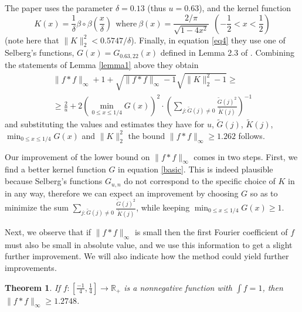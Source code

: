 \documentclass[12pt]{amsart}
\newtheorem{theorem}{Theorem}[section]
\theoremstyle{definition}
\newcommand{\R}{\ensuremath{\mathbb{R}}}
\begin{document}
\medskip

The paper \cite{martin} uses the parameter $\delta=0.13$ (thus
$u=0.63$), and the kernel function
\begin{equation}\label{kx}K(x)=\frac{1}{\delta}\beta \circ \beta
\left( \frac{x}{\delta} \right) \ \ \mathrm{where}
 \ \beta(x)=\frac{2/\pi}{\sqrt{1-4x^2}}  \ \ \left( -\frac{1}{2}<x<\frac{1}{2} \right)\end{equation} (note here
that $\|K\|_2^2<0.5747/\delta$). Finally, in equation \eqref{eq4}
they use one of Selberg's functions, $G(x)=G_{0.63, 22}(x)$ defined
in Lemma 2.3 of \cite{martin}. Combining the statements of Lemma
\ref{lemma1} above they obtain
\begin{eqnarray}\label{basic} \|f\ast f\|_\infty + 1 + \sqrt{\|f\ast f\|_\infty-1}\sqrt{\|K\|_2^2-1} \ge \\
\ge \frac{2}{u}+2\left (\min_{0\le x\le 1/4} G(x) \right )^2 \cdot \left ( \sum_{j: \tilde G(j)\ne 0} \frac{\tilde G(j)^2}{\tilde K(j)} \right )^{-1} \nonumber
\end{eqnarray}
and substituting the values and estimates they have for $u$,
$\tilde G(j)$, $\tilde K(j)$, $\min_{0\le x\le 1/4} G(x)$ and
$\|K\|_2^2$ the bound $\|f\ast f\|_\infty \ge 1.262$ follows.

\medskip

Our improvement of the lower bound on $\|f\ast f\|_\infty$ comes in two steps.
First, we find a better kernel function $G$ in equation
\eqref{basic}. This is indeed plausible because Selberg's
functions $G_{u,n}$ do not correspond to the specific choice of
$K$ in \cite{martin} in any way, therefore we can expect an
improvement by choosing $G$ so as to minimize the sum $\sum_{j:
\tilde G(j)\ne 0} \frac{\tilde G(j)^2}{\tilde K(j)}$, while
keeping $\min_{0\le x\le 1/4} G(x)\ge 1$.

\medskip

Next, we observe that if $\|f\ast f\|_\infty$ is small then the first Fourier
coefficient of $f$ must also be small in absolute value, and we
use this information to get a slight further improvement. We will
also indicate how the method could yield further improvements.

\begin{theorem}\label{main}
If $f: [\frac{-1}{4},\frac{1}{4}]\to \R_+$ is a nonnegative
function with $\int f=1$, then $\|f\ast f\|_\infty \ge 1.2748$.
\end{theorem}
\end{document}
